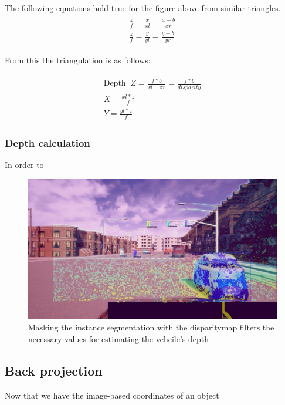 The following equations hold true for the figure above from similar triangles.
\begin{align}
    \begin{split}
        \frac{z}{f} = \frac{x}{xl} =  \frac{x-b}{xr} \\
        \frac{z}{f} = \frac{y}{yl} =  \frac{y-b}{yr}
    \end{split}
\end{align}

From this the triangulation is as follows:

\begin{align}
    \begin{split}
        \text{Depth}\;\; Z = \frac{f*b}{xl - xr} =  \frac{f*b}{disparity} \\
        X = \frac{xl*z}{f} \\
        Y = \frac{yl*z}{f}
    \end{split}
\end{align}


\subsubsection{Depth calculation}

In order to 

\begin{figure}[!ht]
    \centering
    \includegraphics[width=150mm, keepaspectratio]{figures/335merged.jpg}
    \caption{Masking the instance segmentation with the disparitymap filters the necessary values for estimating the vehcile's depth}
    \label{fig:merged}
\end{figure}

\subsection{Back projection}
Now that we have the image-based coordinates of an object 

